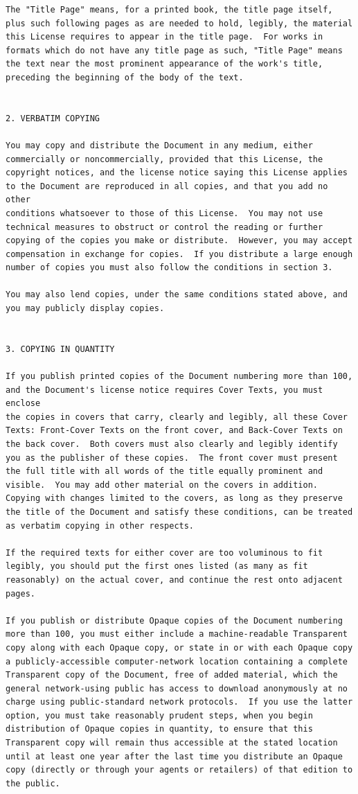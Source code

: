 \documentclass[12pt]{report}
\begin{document}
\begin{verbatim}
The "Title Page" means, for a printed book, the title page itself,
plus such following pages as are needed to hold, legibly, the material
this License requires to appear in the title page.  For works in
formats which do not have any title page as such, "Title Page" means
the text near the most prominent appearance of the work's title,
preceding the beginning of the body of the text.


2. VERBATIM COPYING

You may copy and distribute the Document in any medium, either
commercially or noncommercially, provided that this License, the
copyright notices, and the license notice saying this License applies
to the Document are reproduced in all copies, and that you add no other
conditions whatsoever to those of this License.  You may not use
technical measures to obstruct or control the reading or further
copying of the copies you make or distribute.  However, you may accept
compensation in exchange for copies.  If you distribute a large enough
number of copies you must also follow the conditions in section 3.

You may also lend copies, under the same conditions stated above, and
you may publicly display copies.


3. COPYING IN QUANTITY

If you publish printed copies of the Document numbering more than 100,
and the Document's license notice requires Cover Texts, you must enclose
the copies in covers that carry, clearly and legibly, all these Cover
Texts: Front-Cover Texts on the front cover, and Back-Cover Texts on
the back cover.  Both covers must also clearly and legibly identify
you as the publisher of these copies.  The front cover must present
the full title with all words of the title equally prominent and
visible.  You may add other material on the covers in addition.
Copying with changes limited to the covers, as long as they preserve
the title of the Document and satisfy these conditions, can be treated
as verbatim copying in other respects.

If the required texts for either cover are too voluminous to fit
legibly, you should put the first ones listed (as many as fit
reasonably) on the actual cover, and continue the rest onto adjacent
pages.

If you publish or distribute Opaque copies of the Document numbering
more than 100, you must either include a machine-readable Transparent
copy along with each Opaque copy, or state in or with each Opaque copy
a publicly-accessible computer-network location containing a complete
Transparent copy of the Document, free of added material, which the
general network-using public has access to download anonymously at no
charge using public-standard network protocols.  If you use the latter
option, you must take reasonably prudent steps, when you begin
distribution of Opaque copies in quantity, to ensure that this
Transparent copy will remain thus accessible at the stated location
until at least one year after the last time you distribute an Opaque
copy (directly or through your agents or retailers) of that edition to
the public.


\end{verbatim}
\end{document}
